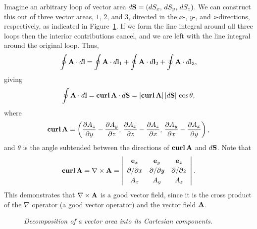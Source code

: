 Imagine an arbitrary loop of vector area $d{\bf S} = (dS_x, \,dS_y, \,dS_z)$. We
can construct this out of three vector areas, $1$, $2$, and $3$, directed in the $x$-, $y$-, and $z$-directions, respectively, as
indicated in Figure~\ref{f22}.
If we form the line integral around all three loops then the interior contributions
cancel, and we are left with the line integral around the original loop. Thus,
\begin{equation}
\oint {\bf A} \cdot d{\bf l} = \oint {\bf A}\cdot d{\bf l}_1 +
\oint {\bf A}\cdot d{\bf l}_2+\oint {\bf A}\cdot d{\bf l}_3,
\end{equation}
giving
\begin{equation}\label{e2145}
\oint {\bf A}\cdot d{\bf l} = {\bf curl}\,{\bf A} \cdot d{\bf S} = 
|{\bf curl}\,{\bf A}|\,|d {\bf S}|\,\cos\theta,
\end{equation}
where
\begin{equation}
{\bf curl}\,{\bf A} = \left(\frac{\partial A_z}{\partial y}- \frac{\partial A_y}
{\partial z},\, \frac{\partial A_x}{\partial z}- \frac{\partial A_z}
{\partial x},\, \frac{\partial A_y}{\partial x}- \frac{\partial A_x}
{\partial y}\right),
\end{equation}
and $\theta$ is the angle subtended between the directions of ${\bf curl}\,{\bf A}$ and $d{\bf S}$. 
Note that
\begin{equation}
{\bf curl}\,{\bf A} = \nabla\times {\bf A} = \left|\begin{array}{ccc}
{\bf e}_x&{\bf e}_y&{\bf e}_z\\[0.5ex]
\partial/\partial x& \partial/\partial y& \partial/\partial z\\[0.5ex]
A_x & A_y & A_z\end{array}\right|.
\end{equation}
This demonstrates that $\nabla\times {\bf A}$ is a good vector field, since it is
the cross product of the $\nabla$ operator (a good vector operator) and 
the vector field ${\bf A}$.
\begin{figure}
\epsfysize=2.25in
\centerline{}
\caption{\em Decomposition of a vector area into its Cartesian components.}\label{f22}
\end{figure}

